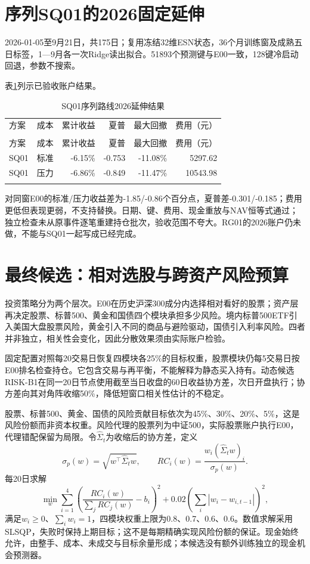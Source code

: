 \documentclass[12pt]{article}
\newcommand{\toprule}{\noalign{\hrule height .8pt}}
\newcommand{\midrule}{\noalign{\hrule height .4pt}}
\newcommand{\bottomrule}{\noalign{\hrule height .8pt}}
\begin{document}
\section{序列SQ01的2026固定延伸}
2026-01-05至9月21日，共175日；复用冻结32维ESN状态，36个月训练窗及成熟五日标签，1—9月各一次Ridge读出拟合。51893个预测键与E00一致，128键冷启动回退，参数不搜索。

表\ref{tab:v3supp5}列示已验收账户结果。
{\footnotesize
\begin{longtable}{@{}lrrrrr@{}}
\caption{SQ01序列路线2026延伸结果}\label{tab:v3supp5}\\
\toprule
方案 & 成本 & 累计收益 & 夏普 & 最大回撤 & 费用（元） \\
\midrule\endfirsthead
\multicolumn{6}{c}{表\thetable（续）}\\\toprule
方案 & 成本 & 累计收益 & 夏普 & 最大回撤 & 费用（元） \\\midrule\endhead
SQ01 & 标准 & -6.15\% & -0.753 & -11.08\% & 5297.62 \\
SQ01 & 压力 & -6.86\% & -0.849 & -11.47\% & 10543.98 \\
\bottomrule\end{longtable}}
对同窗E00的标准/压力收益差为-1.85/-0.86个百分点，夏普差-0.301/-0.185；费用更低但表现更弱，不支持替换。日期、键、费用、现金重放与NAV恒等式通过；独立检查未从原事件逐笔重建持仓批次，验收范围不夸大。RG01的2026账户仍未做，不能与SQ01一起写成已经完成。


\section{最终候选：相对选股与跨资产风险预算}
投资策略分为两个层次。E00在历史沪深300成分内选择相对看好的股票；资产层再决定股票、标普500、黄金和国债四个模块承担多少风险。境内标普500ETF引入美国大盘股票风险，黄金引入不同的商品与避险驱动，国债引入利率风险。四者并非独立，相关性会变化，因此分散效果须由实际账户检验。

固定配置对照每20交易日恢复四模块各25\%的目标权重，股票模块仍每5交易日按E00排名检查持仓。它包含交易与再平衡，不能解释为静态买入持有。动态候选RISK-B1在同一20日节点使用截至当日收盘的60日收益协方差，次日开盘执行；协方差向其对角阵收缩50\%，降低短窗口相关性估计的不稳定。

股票、标普500、黄金、国债的风险贡献目标依次为45\%、30\%、20\%、5\%，这是风险份额而非资本权重。风险代理的股票列为中证500，实际股票账户执行E00，代理错配保留为局限。令$\widehat\Sigma_t$为收缩后的协方差，定义
\begin{equation}
\sigma_p(w)=\sqrt{w^\top\widehat\Sigma_t w},\qquad
RC_i(w)=\frac{w_i(\widehat\Sigma_t w)_i}{\sigma_p(w)}.
\end{equation}
每20日求解
\begin{equation}
\min_w\sum_{i=1}^4\left(\frac{RC_i(w)}{\sum_jRC_j(w)}-b_i\right)^2
+0.02\left(\sum_i|w_i-w_{i,t-1}|\right)^2,
\end{equation}
满足$w_i\ge0$、$\sum_iw_i=1$，四模块权重上限为0.8、0.7、0.6、0.6。数值求解采用SLSQP，失败时保持上期目标；这不是每期精确实现风险份额的保证。现金始终允许，由整手、成本、未成交与目标余量形成；本候选没有额外训练独立的现金机会预测器。
\end{document}
